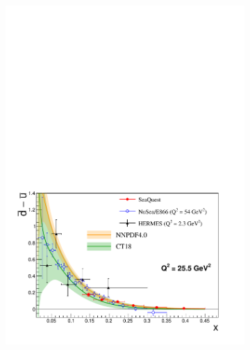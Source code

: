 \documentclass[reprint,aps,unsortedaddress,superscriptaddress,prl,floatfix,showpacs,linenumbers]{revtex4-2}
\begin{document}
\begin{figure}[htpb!]
	\centering
	\begin{subfigure}{\linewidth}
		\includegraphics[width=\linewidth]{dbub_diff_with_PDF.pdf}
	\end{subfigure}
	\begin{subfigure}{\linewidth}

\end{subfigure}
\end{figure}
\end{document}
